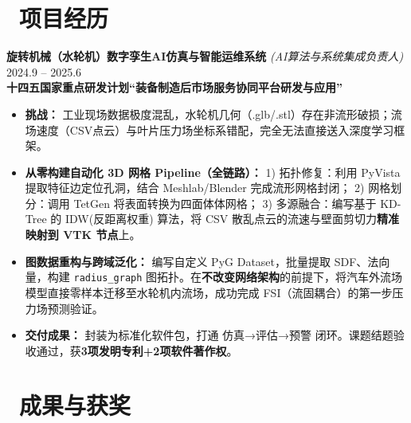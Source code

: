 \documentclass[11pt]{article}
\begin{document}
\section{\makebox[\widthof{\faBriefcase}][c]{\color{CVBlue}%
\faBriefcase}\ 项目经历}

\textbf{旋转机械（水轮机）数字孪生AI仿真与智能运维系统} 
\textit{(AI算法与系统集成负责人)} 
\hfill 2024.9 -- 2025.6\\[0.2em]
\textcolor{CVBlue}{\textbf{十四五国家重点研发计划``装备制造后市场服务协同平台研发与应用''}}
\begin{itemize}
    \item \textbf{挑战：} 工业现场数据极度混乱，水轮机几何（.glb/.stl）存在非流形破损；流场速度（CSV点云）与叶片压力场坐标系错配，完全无法直接送入深度学习框架。
    \item \textbf{从零构建自动化 3D 网格 Pipeline（全链路）：} 
        1) 拓扑修复：利用 PyVista 提取特征边定位孔洞，结合 Meshlab/Blender 完成流形网格封闭；
        2) 网格划分：调用 TetGen 将表面转换为四面体体网格；
        3) 多源融合：编写基于 KD-Tree 的 IDW(反距离权重) 算法，将 CSV 散乱点云的流速与壁面剪切力\textbf{精准映射到 VTK 节点}上。
    \item \textbf{图数据重构与跨域泛化：} 编写自定义 PyG Dataset，批量提取 SDF、法向量，构建 \texttt{radius\_graph} 图拓扑。在\textbf{不改变网络架构}的前提下，将汽车外流场模型直接零样本迁移至水轮机内流场，成功完成 FSI（流固耦合）的第一步压力场预测验证。
    \item \textbf{交付成果：} 封装为标准化软件包，打通 仿真→评估→预警 闭环。课题结题验收通过，获\textbf{3项发明专利+2项软件著作权}。
\end{itemize}



\section{%
    \makebox[\widthof{\faTrophy}][c]%
    {\color{CVBlue}\faTrophy}\ 成果与获奖%
}
\end{document}
